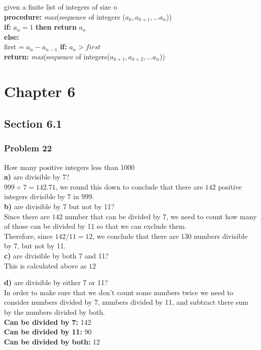 \documentclass[paper=a4, fontsize=11pt]{scrartcl} %
\begin{document}
given a finite list of integers of size $n$\\
\textbf{procedure: }\textit{max}(sequence of integers ($a_k, a_{k+1}, \ldots a_n$))\\
\textbf{if: } $a_n = 1$ \textbf{then return} $a_n$\\
\textbf{else:}\\
first = $a_n - a_{n-1}$
\textbf{if: } $a_n > first$\\
\textbf{return:} \textit{max}(sequence of integers($a_{k+1}, a_{k+2}, \ldots a_n$))

\section*{Chapter 6}
\subsection*{Section 6.1}
\subsubsection*{Problem 22}
How many positive integers less than 1000\\
\textbf{a)} are divisible by 7?\\
$999 \div 7 = 142.71$, we round this down to conclude that there are $142$ positive integers divisible by 7 in 999.\\

\textbf{b)} are divisible by 7 but not by 11?\\
Since there are $142$ number that can be divided by 7, we need to count how many of those can be divided by 11 so that we can exclude them.\\
Therefore, since $142/11 = 12$, we conclude that there are $130$ numbers divisible by 7, but not by 11.\\

\textbf{c)} are divisible by both 7 and 11?\\
This is calculated above as $12$

\textbf{d)} are divisible by either 7 or 11?\\
In order to make sure that we don't count some numbers twice we need to consider numbers divided by 7, numbers divided by 11, and subtract there sum by the numbers divided by both.\\
\textbf{Can be divided by 7: } 142 \\
\textbf{Can be divided by 11: } 90\\
\textbf{Can be divided by both: } 12\\
\end{document}
